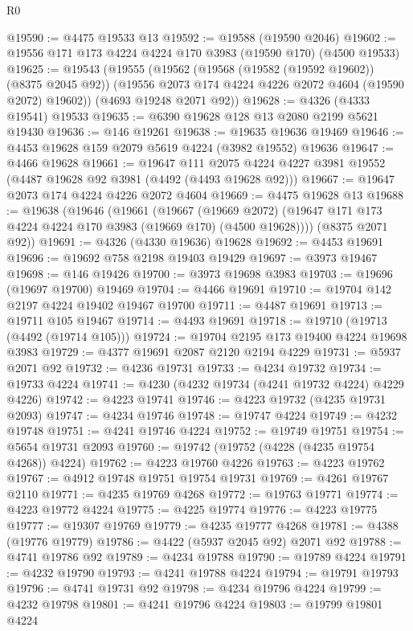 \begin{lexlean}{R0}
\begin{coremodule}
@19590 := @4475 @19533 @13
@19592 := @19588 (@19590 @2046)
@19602 := @19556 @171 @173 @4224 @4224 @170 @3983 (@19590 @170) (@4500 @19533)
@19625 := @19543
    (@19555
      (@19562
        (@19568 (@19582 (@19592 @19602)) (@8375 @2045 @92))
        (@19556 @2073 @174 @4224 @4226 @2072 @4604 (@19590 @2072) @19602))
      (@4693 @19248 @2071 @92))
@19628 := @4326 (@4333 @19541) @19533
@19635 := @6390 @19628 @128 @13 @2080 @2199 @5621 @19430
@19636 := @146 @19261
@19638 := @19635 @19636 @19469
@19646 := @4453 @19628 @159 @2079 @5619 @4224 (@3982 @19552) @19636
@19647 := @4466 @19628
@19661 := @19647
    @111
    @2075
    @4224
    @4227
    @3981
    @19552
    (@4487 @19628 @92 @3981 (@4492 (@4493 @19628 @92)))
@19667 := @19647 @2073 @174 @4224 @4226 @2072 @4604
@19669 := @4475 @19628 @13
@19688 := @19638
    (@19646
      (@19661
        (@19667
          (@19669 @2072)
          (@19647 @171 @173 @4224 @4224 @170 @3983 (@19669 @170) (@4500 @19628))))
      (@8375 @2071 @92))
@19691 := @4326 (@4330 @19636) @19628
@19692 := @4453 @19691
@19696 := @19692 @758 @2198 @19403 @19429
@19697 := @3973 @19467
@19698 := @146 @19426
@19700 := @3973 @19698 @3983
@19703 := @19696 (@19697 @19700) @19469
@19704 := @4466 @19691
@19710 := @19704 @142 @2197 @4224 @19402 @19467 @19700
@19711 := @4487 @19691
@19713 := @19711 @105 @19467
@19714 := @4493 @19691
@19718 := @19710 (@19713 (@4492 (@19714 @105)))
@19724 := @19704 @2195 @173 @19400 @4224 @19698 @3983
@19729 := @4377 @19691 @2087 @2120 @2194 @4229
@19731 := @5937 @2071 @92
@19732 := @4236 @19731
@19733 := @4234 @19732
@19734 := @19733 @4224
@19741 := @4230 (@4232 @19734 (@4241 @19732 @4224) @4229 @4226)
@19742 := @4223 @19741
@19746 := @4223 @19732 (@4235 @19731 @2093)
@19747 := @4234 @19746
@19748 := @19747 @4224
@19749 := @4232 @19748
@19751 := @4241 @19746 @4224
@19752 := @19749 @19751
@19754 := @5654 @19731 @2093
@19760 := @19742 (@19752 (@4228 (@4235 @19754 @4268)) @4224)
@19762 := @4223 @19760 @4226
@19763 := @4223 @19762
@19767 := @4912 @19748 @19751 @19754 @19731
@19769 := @4261 @19767 @2110
@19771 := @4235 @19769 @4268
@19772 := @19763 @19771
@19774 := @4223 @19772 @4224
@19775 := @4225 @19774
@19776 := @4223 @19775
@19777 := @19307 @19769
@19779 := @4235 @19777 @4268
@19781 := @4388 (@19776 @19779)
@19786 := @4422 (@5937 @2045 @92) @2071 @92
@19788 := @4741 @19786 @92
@19789 := @4234 @19788
@19790 := @19789 @4224
@19791 := @4232 @19790
@19793 := @4241 @19788 @4224
@19794 := @19791 @19793
@19796 := @4741 @19731 @92
@19798 := @4234 @19796 @4224
@19799 := @4232 @19798
@19801 := @4241 @19796 @4224
@19803 := @19799 @19801 @4224

\end{coremodule}
\end{lexlean}

